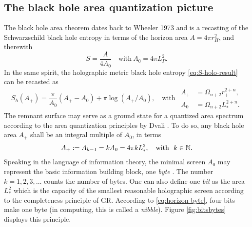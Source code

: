 \documentclass[12pt,a4paper]{report}
\numberwithin{equation}{chapter}
\begin{document}
\subsection{The black hole area quantization picture}\label{sec:holo-area-quant}
The black hole area theorem dates back to Wheeler 1973 and is a recasting of the Schwarzschild black hole entropy in terms of the horizon area $A=4\pi r_H^2$, and therewith
\begin{equation}\label{eq:horizon-byte}
S = \frac A {4A_0}
\quad \text{with}~A_0 = 4\pi L_P^2.
\end{equation}
%
In the same spirit, the holographic metric black hole entropy \eqref{eq:S-holo-result} can be recasted as
\begin{equation}
S_h(A_+) = \frac{\pi}{A_0} (A_+ - A_0) + \pi \log(A_+ / A_0),
\quad\text{with}~~
\begin{aligned}
A_+&=\Omega_{n+2} r_+^{2+n}, \\
A_0&=\Omega_{n+2} L_*^{2+n}.
\end{aligned}
\end{equation}
%
The remnant surface may serve as a ground state for a quantized area spectrum according to the area quantization principles by Dvali \cite{Dvali:2011aa,dvali2}. To do so, any black hole area $A_+$ shall be an integral multiple of $A_0$, in terms
\begin{equation}\label{eq:holo-quant-rule}
A_+ := A_{k-1} = k A_0 = 4\pi k L_*^2,
\quad\text{with}~~k\in\mathbb{N}.
\end{equation}
Speaking in the language of information theory, the minimal screen $A_0$ may represent the basic information building block, one \emph{byte} \cite{NS2013}. The number $k=1,2,3,\dots$ counts the number of bytes. One can also define one \emph{bit} as the area $L_*^2$ which is the capacity of the smallest reasonable holographic screen according to the completeness principle of GR. According to \eqref{eq:horizon-byte}, four bits make one byte (in computing, this is called a \emph{nibble}). Figure \ref{fig:bitsbytes} displays this principle.
\end{document}
